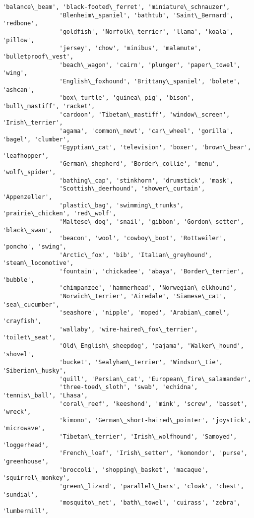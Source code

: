 \documentclass[11pt]{article}
\begin{document}
\begin{Verbatim}[commandchars=\\\{\}]
                'balance\_beam', 'black-footed\_ferret', 'miniature\_schnauzer',
                'Blenheim\_spaniel', 'bathtub', 'Saint\_Bernard', 'redbone',
                'goldfish', 'Norfolk\_terrier', 'llama', 'koala', 'pillow',
                'jersey', 'chow', 'minibus', 'malamute', 'bulletproof\_vest',
                'beach\_wagon', 'cairn', 'plunger', 'paper\_towel', 'wing',
                'English\_foxhound', 'Brittany\_spaniel', 'bolete', 'ashcan',
                'box\_turtle', 'guinea\_pig', 'bison', 'bull\_mastiff', 'racket',
                'cardoon', 'Tibetan\_mastiff', 'window\_screen', 'Irish\_terrier',
                'agama', 'common\_newt', 'car\_wheel', 'gorilla', 'bagel', 'clumber',
                'Egyptian\_cat', 'television', 'boxer', 'brown\_bear', 'leafhopper',
                'German\_shepherd', 'Border\_collie', 'menu', 'wolf\_spider',
                'bathing\_cap', 'stinkhorn', 'drumstick', 'mask',
                'Scottish\_deerhound', 'shower\_curtain', 'Appenzeller',
                'plastic\_bag', 'swimming\_trunks', 'prairie\_chicken', 'red\_wolf',
                'Maltese\_dog', 'snail', 'gibbon', 'Gordon\_setter', 'black\_swan',
                'beacon', 'wool', 'cowboy\_boot', 'Rottweiler', 'poncho', 'swing',
                'Arctic\_fox', 'bib', 'Italian\_greyhound', 'steam\_locomotive',
                'fountain', 'chickadee', 'abaya', 'Border\_terrier', 'bubble',
                'chimpanzee', 'hammerhead', 'Norwegian\_elkhound',
                'Norwich\_terrier', 'Airedale', 'Siamese\_cat', 'sea\_cucumber',
                'seashore', 'nipple', 'moped', 'Arabian\_camel', 'crayfish',
                'wallaby', 'wire-haired\_fox\_terrier', 'toilet\_seat',
                'Old\_English\_sheepdog', 'pajama', 'Walker\_hound', 'shovel',
                'bucket', 'Sealyham\_terrier', 'Windsor\_tie', 'Siberian\_husky',
                'quill', 'Persian\_cat', 'European\_fire\_salamander',
                'three-toed\_sloth', 'swab', 'echidna', 'tennis\_ball', 'Lhasa',
                'coral\_reef', 'keeshond', 'mink', 'screw', 'basset', 'wreck',
                'kimono', 'German\_short-haired\_pointer', 'joystick', 'microwave',
                'Tibetan\_terrier', 'Irish\_wolfhound', 'Samoyed', 'loggerhead',
                'French\_loaf', 'Irish\_setter', 'komondor', 'purse', 'greenhouse',
                'broccoli', 'shopping\_basket', 'macaque', 'squirrel\_monkey',
                'green\_lizard', 'parallel\_bars', 'cloak', 'chest', 'sundial',
                'mosquito\_net', 'bath\_towel', 'cuirass', 'zebra', 'lumbermill',

\end{Verbatim}
\end{document}
